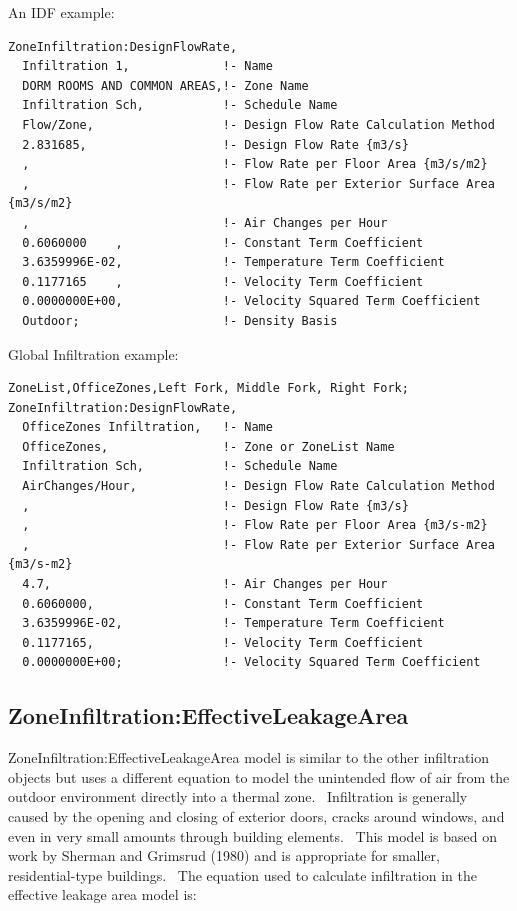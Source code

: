 An IDF example:

\begin{lstlisting}
ZoneInfiltration:DesignFlowRate,
  Infiltration 1,             !- Name
  DORM ROOMS AND COMMON AREAS,!- Zone Name
  Infiltration Sch,           !- Schedule Name
  Flow/Zone,                  !- Design Flow Rate Calculation Method
  2.831685,                   !- Design Flow Rate {m3/s}
  ,                           !- Flow Rate per Floor Area {m3/s/m2}
  ,                           !- Flow Rate per Exterior Surface Area {m3/s/m2}
  ,                           !- Air Changes per Hour
  0.6060000    ,              !- Constant Term Coefficient
  3.6359996E-02,              !- Temperature Term Coefficient
  0.1177165    ,              !- Velocity Term Coefficient
  0.0000000E+00,              !- Velocity Squared Term Coefficient
  Outdoor;                    !- Density Basis
\end{lstlisting}

Global Infiltration example:

\begin{lstlisting}
ZoneList,OfficeZones,Left Fork, Middle Fork, Right Fork;
ZoneInfiltration:DesignFlowRate,
  OfficeZones Infiltration,   !- Name
  OfficeZones,                !- Zone or ZoneList Name
  Infiltration Sch,           !- Schedule Name
  AirChanges/Hour,            !- Design Flow Rate Calculation Method
  ,                           !- Design Flow Rate {m3/s}
  ,                           !- Flow Rate per Floor Area {m3/s-m2}
  ,                           !- Flow Rate per Exterior Surface Area {m3/s-m2}
  4.7,                        !- Air Changes per Hour
  0.6060000,                  !- Constant Term Coefficient
  3.6359996E-02,              !- Temperature Term Coefficient
  0.1177165,                  !- Velocity Term Coefficient
  0.0000000E+00;              !- Velocity Squared Term Coefficient
\end{lstlisting}

\subsection{ZoneInfiltration:EffectiveLeakageArea}\label{zoneinfiltrationeffectiveleakagearea}

ZoneInfiltration:EffectiveLeakageArea model is similar to the other infiltration objects but uses a different equation to model the unintended flow of air from the outdoor environment directly into a thermal zone.~ Infiltration is generally caused by the opening and closing of exterior doors, cracks around windows, and even in very small amounts through building elements.~ This model is based on work by Sherman and Grimsrud (1980) and is appropriate for smaller, residential-type buildings.~ The equation used to calculate infiltration in the effective leakage area model is:

